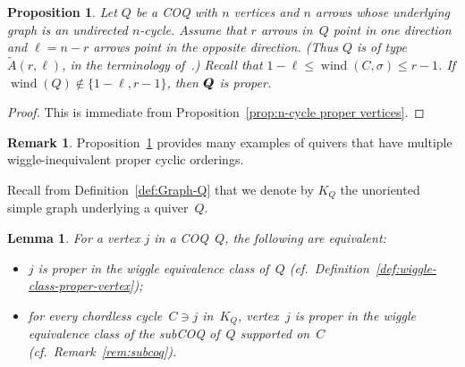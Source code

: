 \documentclass[11pt, letterpaper]{amsart}
\newcommand{\wiggleQ}{Q \hspace{-7pt} Q}%
\newtheorem{proposition}[theorem]{Proposition}
\newtheorem{lemma}[theorem]{Lemma}
\theoremstyle{definition}
\newtheorem{remark}[theorem]{Remark}
\numberwithin{equation}{section}
\def\wind{{\operatorname{wind}}}
\newcommand\GQ{K_Q}
\begin{document}
\begin{proposition}
\label{prop:n-cycle proper vertices 2}
Let $Q$ be a COQ with $n$ vertices and $n$ arrows whose underlying graph is an undirected $n$-cycle.
Assume that $r$ arrows in~$Q$ point in one direction and $\ell=n-r$ arrows point in the opposite direction.
(Thus $Q$ is of type $\tilde A(r,\ell)$, in the terminology of~\cite{cats1}.) 
Recall that $1-\ell\le \wind(C,\sigma)\le r-1$. 
If $\wind(Q) \notin \{1-\ell, r-1\}$, then $\wiggleQ$ is proper.
\end{proposition}

\begin{proof}
This is immediate from Proposition~\ref{prop:n-cycle proper vertices}.
\end{proof}

\begin{remark}
\label{rem:wiggle-inequiv-proper-orderings}
Proposition~\ref{prop:n-cycle proper vertices 2} provides many examples of quivers 
that have multiple wiggle-inequivalent proper cyclic orderings. 
\end{remark}

Recall from Definition~\ref{def:Graph-Q} that we denote by $\GQ$ the unoriented simple graph underlying a quiver~$Q$. 

\begin{lemma}
\label{lem:small winding wiggles}
For a vertex $j$ in a COQ~$Q$, the following are equivalent: 
\begin{itemize}[leftmargin=.25in]
\item[{\rm (a)}] 
$j$ is proper in the wiggle equivalence class of~$Q$ 
(cf.\ Definition~\ref{def:wiggle-class-proper-vertex});
\item[{\rm (b)}] 
for every chordless cycle~$C\ni j$ in~$\GQ$, 
vertex~$j$ is proper in the wiggle equivalence class of the subCOQ of~$Q$ supported on~$C$ (cf.\ Remark~\ref{rem:subcoq}). 
\end{itemize}
\end{lemma}
\end{document}
